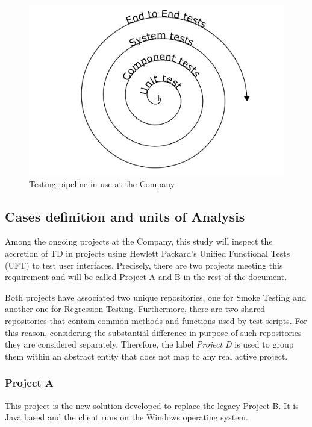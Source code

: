 
\begin{figure}[hbt]
    \centering
    \includegraphics[width=\textwidth]{figure/testing_pipeline.pdf}
    \caption{Testing pipeline in use at the Company}
    \label{fig:testing_pipeline}
\end{figure}

\subsection{Cases definition and units of Analysis} \label{sec:cases_definition}

Among the ongoing projects at the Company, this study will inspect the accretion of TD in projects using Hewlett Packard's Unified Functional Tests (UFT) to test user interfaces. Precisely, there are two projects meeting this requirement and will be called Project A and B in the rest of the document.

Both projects have associated two unique repositories, one for Smoke Testing and another one for Regression Testing. Furthermore, there are two shared repositories that contain common methods and functions used by test scripts. For this reason, considering the substantial difference in purpose of such repositories they are considered separately. Therefore, the label \textit{Project D} is used to group them within an abstract entity that does not map to any real active project.


\subsubsection{Project A}
This project is the new solution developed to replace the legacy Project B. It is Java based and the client runs on the Windows operating system.

